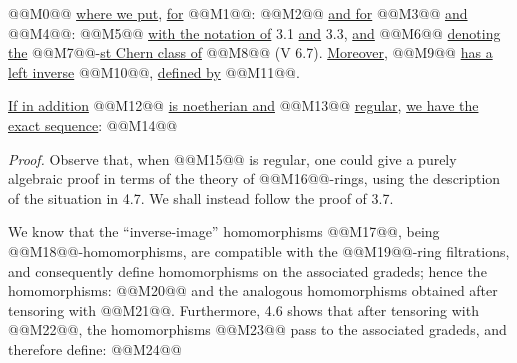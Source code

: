 @@M0@@
\uline{where we put}, \uline{for} @@M1@@:
@@M2@@
\uline{and for} @@M3@@ \uline{and} @@M4@@:
@@M5@@
\uline{with the notation of} 3.1 \uline{and} 3.3, \uline{and} @@M6@@ \uline{denoting the} @@M7@@-\uline{st Chern class of} @@M8@@ (V 6.7). \uline{Moreover}, @@M9@@ \uline{has a left inverse} @@M10@@, \uline{defined by} @@M11@@.

\uline{If in addition} @@M12@@ \uline{is noetherian and} @@M13@@ \uline{regular}, \uline{we have the exact sequence}:
@@M14@@

\emph{Proof.} Observe that, when @@M15@@ is regular, one could give a purely algebraic proof in terms of the theory of @@M16@@-rings, using the description of the situation in 4.7. We shall instead follow the proof of 3.7.

We know that the ``inverse-image'' homomorphisms @@M17@@, being @@M18@@-homomorphisms, are compatible with the @@M19@@-ring filtrations, and consequently define homomorphisms on the associated gradeds; hence the homomorphisms:
@@M20@@
and the analogous homomorphisms obtained after tensoring with @@M21@@. Furthermore, 4.6 shows that after tensoring with @@M22@@, the homomorphisms @@M23@@ pass to the associated gradeds, and therefore define:
@@M24@@
